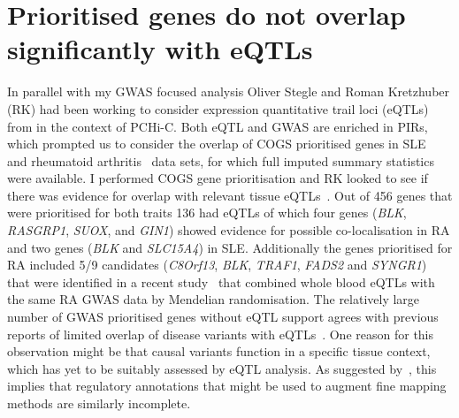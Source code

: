 \documentclass[a4paper,11pt]{report}
\begin{document}




\section{Prioritised genes do not overlap significantly with eQTLs}
In parallel with my GWAS focused analysis Oliver Stegle and Roman Kretzhuber (RK) had been working to consider expression quantitative trail loci (eQTLs) from \citet{FairfaxMakinoRadhakrishnanEtAl2012} in the context of PCHi-C. Both eQTL and GWAS are enriched in PIRs, which prompted us to consider the overlap of COGS prioritised genes in SLE~\citep{Bentham2015-di} and rheumatoid arthritis~\citep{Okada2014-um} data sets, for which full imputed summary statistics were available. I performed COGS gene prioritisation and RK looked to see if there was evidence for overlap with relevant tissue eQTLs~\citep{FairfaxMakinoRadhakrishnanEtAl2012}.  Out of 456 genes that were prioritised for both traits 136 had eQTLs  of which four genes (\textit{BLK}, \textit{RASGRP1}, \textit{SUOX}, and \textit{GIN1}) showed evidence for possible co-localisation in RA and two genes (\textit{BLK} and \textit{SLC15A4}) in SLE. Additionally the genes prioritised for RA included 5/9 candidates (\textit{C8Orf13}, \textit{BLK}, \textit{TRAF1}, \textit{FADS2} and \textit{SYNGR1}) that were identified in a recent study~\citep{ZhuZhangHuEtAl2016} that combined whole blood eQTLs with the same RA GWAS data by Mendelian randomisation. The relatively large number of GWAS prioritised genes without eQTL support  agrees with previous reports of limited overlap of disease variants with eQTLs~\citep{Guo2015-ka,HuangChenEsparzaEtAl2015}. One reason for this observation might be that  causal variants function in a specific tissue context, which has yet to be suitably assessed by eQTL analysis. As suggested by~\citet{Huang2015-ug}, this implies that regulatory annotations that might be used to augment fine mapping methods are similarly incomplete. 
\end{document}

